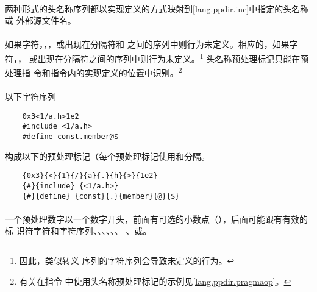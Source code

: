 \semantic
\paragraph{}
两种形式的头名称序列都以实现定义的方式映射到\ref{lang.ppdir.inc}中指定的头名称或
外部源文件名。

\paragraph{}
如果字符\tm{\sq}，\tm{\bs}，\tm{\dq}，\tm{\bs\bs}或\tm{/*}出现在分隔符\tm{<}和
\tm{>}之间的序列中则行为未定义。相应的，如果字符\tm{\sq}，\tm{\bs}，\tm{\bs\bs}
或\tm{/*}出现在\tm{\dq}分隔符之间的序列中则行为未定义。\footnote{因此，类似转义
序列的字符序列会导致未定义的行为。} 头名称预处理标记只能在预处理指
令和指令内的实现定义的位置中识别。\footnote{有关在指令
中使用头名称预处理标记的示例见\ref{lang.ppdir.pragmaop}。}

\paragraph{}
\ex* 以下字符序列
\begin{lstlisting}
    0x3<1/a.h>1e2
    #include <1/a.h>
    #define const.member@$
\end{lstlisting}
构成以下的预处理标记（每个预处理标记使用\tm{\{}和\tm{\}}分隔。
\begin{lstlisting}
    {0x3}{<}{1}{/}{a}{.}{h}{>}{1e2}
    {#}{include} {<1/a.h>}
    {#}{define} {const}{.}{member}{@}{$}
\end{lstlisting}


\syntax
\paragraph{}

\desc
\paragraph{}
一个预处理数字以一个数字开头，前面有可选的小数点（），后面可能跟有有效的标
识符字符和字符序列、、、、、、
、或。

